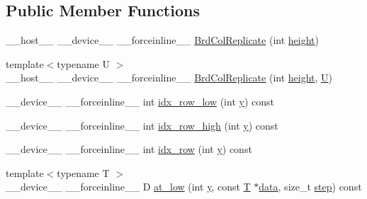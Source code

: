 \subsection*{Public Member Functions}
\begin{DoxyCompactItemize}
\item 
\-\_\-\-\_\-host\-\_\-\-\_\- \-\_\-\-\_\-device\-\_\-\-\_\- \-\_\-\-\_\-forceinline\-\_\-\-\_\- \hyperlink{structcv_1_1gpu_1_1device_1_1BrdColReplicate_aa8997bea5d088b6900f58084affba715}{Brd\-Col\-Replicate} (int \hyperlink{highgui__c_8h_adc7b4b8a6ef510e136071efbc9cd9a58}{height})
\item 
{\footnotesize template$<$typename U $>$ }\\\-\_\-\-\_\-host\-\_\-\-\_\- \-\_\-\-\_\-device\-\_\-\-\_\- \-\_\-\-\_\-forceinline\-\_\-\-\_\- \hyperlink{structcv_1_1gpu_1_1device_1_1BrdColReplicate_a860747e479ec007290481f57656912a7}{Brd\-Col\-Replicate} (int \hyperlink{highgui__c_8h_adc7b4b8a6ef510e136071efbc9cd9a58}{height}, \hyperlink{core__c_8h_aa9c521f41af9a5191e5e4b6ffbae211a}{U})
\item 
\-\_\-\-\_\-device\-\_\-\-\_\- \-\_\-\-\_\-forceinline\-\_\-\-\_\- int \hyperlink{structcv_1_1gpu_1_1device_1_1BrdColReplicate_aeb1ab4a731b0a9087d5f4be60090da6d}{idx\-\_\-row\-\_\-low} (int \hyperlink{highgui__c_8h_af1202c02b14870c18fb3a1da73e9e7c7}{y}) const 
\item 
\-\_\-\-\_\-device\-\_\-\-\_\- \-\_\-\-\_\-forceinline\-\_\-\-\_\- int \hyperlink{structcv_1_1gpu_1_1device_1_1BrdColReplicate_a0ec03a1523293aff1d0f58c2841a06ee}{idx\-\_\-row\-\_\-high} (int \hyperlink{highgui__c_8h_af1202c02b14870c18fb3a1da73e9e7c7}{y}) const 
\item 
\-\_\-\-\_\-device\-\_\-\-\_\- \-\_\-\-\_\-forceinline\-\_\-\-\_\- int \hyperlink{structcv_1_1gpu_1_1device_1_1BrdColReplicate_af2add1532ed32489745a1f10b14a3e06}{idx\-\_\-row} (int \hyperlink{highgui__c_8h_af1202c02b14870c18fb3a1da73e9e7c7}{y}) const 
\item 
{\footnotesize template$<$typename T $>$ }\\\-\_\-\-\_\-device\-\_\-\-\_\- \-\_\-\-\_\-forceinline\-\_\-\-\_\- D \hyperlink{structcv_1_1gpu_1_1device_1_1BrdColReplicate_a153d7dc6b3aaf55f9920da87b379f26b}{at\-\_\-low} (int \hyperlink{highgui__c_8h_af1202c02b14870c18fb3a1da73e9e7c7}{y}, const \hyperlink{calib3d_8hpp_a3efb9551a871ddd0463079a808916717}{T} $\ast$\hyperlink{legacy_8hpp_ab9fe6c09e6d02865a953fffc12fe6ca0}{data}, size\-\_\-t \hyperlink{legacy_8hpp_abc16e65f240ed0c8f3e876e8732c0a33}{step}) const 
\item 

\end{DoxyCompactItemize}
